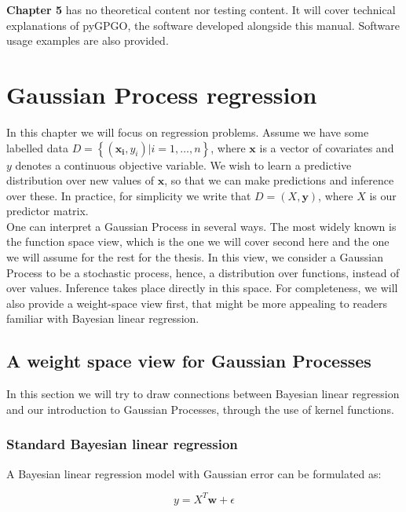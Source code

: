 \documentclass[10pt,a4paper,twoside]{book}
\begin{document}
\textbf{Chapter 5} has no theoretical content nor testing content. It will cover technical explanations of pyGPGO, the software developed alongside this manual. Software usage examples are also provided. 

\chapter{Gaussian Process regression}

 In this chapter we will focus on regression problems. Assume we have some labelled data $D = \left\lbrace \left(\boldsymbol{x_i}, y_i\right) | i = 1,\dots,n\right\rbrace$, where $\boldsymbol{x}$ is a vector of covariates and $y$ denotes a continuous objective variable. We wish to learn a predictive distribution over new values of $\boldsymbol{x}$, so that we can make predictions and inference over these. In practice, for simplicity we write that $D = \left(X, \boldsymbol{y}\right)$, where $X$ is our predictor matrix.\\

One can interpret a Gaussian Process in several ways. The most widely known is the function space view, which is the one we will cover second here and the one we will assume for the rest for the thesis. In this view, we consider a Gaussian Process to be a stochastic process, hence, a distribution over functions, instead of over values. Inference takes place directly in this space. For completeness, we will also provide a weight-space view first, that might be more appealing to readers familiar with Bayesian linear regression.\\

\section{A weight space view for Gaussian Processes}

In this section we will try to draw connections between Bayesian linear regression and our introduction to Gaussian Processes, through the use of kernel functions. 

\subsection{Standard Bayesian linear regression}

A Bayesian linear regression model with Gaussian error can be formulated as:

\begin{equation}
\label{linearmodel}
y = X^T \boldsymbol{w} + \epsilon
\end{equation} 
\end{document}
